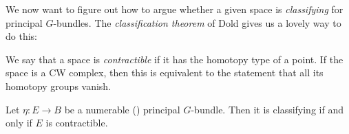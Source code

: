 \documentclass[11pt]{book}
\begin{document}
We now want to figure out how to argue whether a given space is \emph{classifying} for principal $G$-bundles. The \emph{classification theorem} of Dold gives us a lovely way to do this:

\begin{definition}\label{def:contractible} We say that a space is \emph{contractible} if it has the homotopy type of a point. If the space is a CW complex, then this is equivalent to the statement that all its homotopy groups vanish.
\end{definition}

\begin{theorem}
\label{thm:classification-thm-principal-G-bundles}
Let $\eta \colon E \to B$ be a numerable () principal $G$-bundle. Then it is classifying if and only if $E$ is contractible.
\end{theorem}
\end{document}
